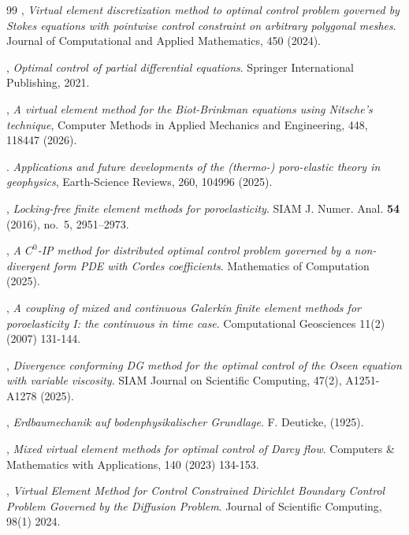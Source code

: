 \documentclass[smallextended]{svjour3}
\numberwithin{equation}{section}
\numberwithin{figure}{section}
\numberwithin{table}{section}
\begin{document}
\begin{thebibliography}{99}
		, {\it Virtual element discretization method to optimal control problem governed by Stokes equations with pointwise control constraint on arbitrary polygonal meshes}. Journal of Computational and Applied Mathematics, 450 (2024).
				
		, {\it Optimal control of partial differential equations}. Springer International Publishing, 2021.

        , {\it A virtual element method for the Biot-Brinkman equations using Nitsche’s technique}, Computer Methods in Applied Mechanics and Engineering, 448, 118447 (2026).

        . {\it Applications and future developments of the (thermo-) poro-elastic theory in geophysics}, Earth-Science Reviews, 260, 104996 (2025).
        
		, {\it Locking-free finite element methods for poroelasticity}. SIAM J. Numer. Anal. {\bf 54} (2016), no.~5, 2951--2973.

        
		, {\it A $C^0$-IP method for distributed optimal control problem governed by a non-divergent form PDE with Cordes coefficients}. Mathematics of Computation (2025).

        , {\it A coupling of mixed and continuous Galerkin finite element methods for poroelasticity I: the continuous in time case}. Computational Geosciences 11(2) (2007) 131-144.

        , {\it Divergence conforming DG method for the optimal control of the Oseen equation with variable viscosity}. SIAM Journal on Scientific Computing, 47(2), A1251-A1278 (2025).

        , {\it Erdbaumechanik auf bodenphysikalischer Grundlage}. F. Deuticke, (1925).
				
		, {\it Mixed virtual element methods for optimal control of Darcy flow}. Computers \& Mathematics with Applications, 140 (2023) 134-153.
				
		, {\it Virtual Element Method for Control Constrained Dirichlet Boundary Control Problem Governed by the Diffusion Problem}. Journal of Scientific Computing, 98(1) 2024.
				

\end{thebibliography}
\end{document}
